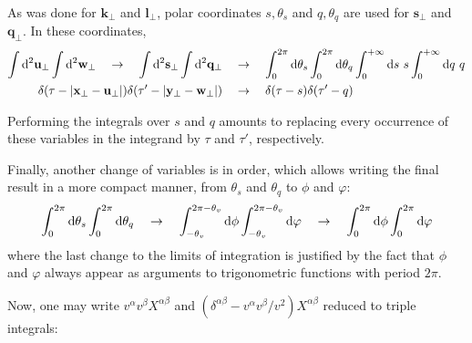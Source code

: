 As was done for $\mathbf{k}_\perp$ and $\mathbf{l}_\perp$, polar coordinates $s, \theta_s$ and $q, \theta_q$ are used for $\mathbf{s}_\perp$ and $\mathbf{q}_\perp$. In these coordinates,
\begin{subequations}
\begin{align}
\int \diff^2 \mathbf{u}_\perp
\int \diff^2 \mathbf{w}_\perp \quad \to \quad 
\int \diff^2 \mathbf{s}_\perp
\int \diff^2 \mathbf{q}_\perp \quad & \to \quad
\int_{0}^{2\pi} \diff \theta_s \int_{0}^{2\pi} \diff \theta_q
\int_0^{+\infty} \diff s ~ s
\int_0^{+\infty} \diff q ~ q \\
\delta(\tau - |\mathbf{x}_\perp - \mathbf{u}_\perp|) \delta(\tau' - |\mathbf{y}_\perp - \mathbf{w}_\perp|) 
\quad & \to \quad
\delta(\tau - s) \delta(\tau' - q)
\end{align}
\end{subequations}

Performing the integrals over $s$ and $q$ amounts to replacing every occurrence of these variables in the integrand by $\tau$ and $\tau'$, respectively. 

Finally, another change of variables is in order, which allows writing the final result in a more compact manner, from $\theta_s$ and $\theta_q$ to $\phi$ and $\varphi$:
\begin{equation}
	\int_{0}^{2\pi} \mathop{}\!\mathrm{d} \theta_s \int_{0}^{2\pi} \mathop{}\!\mathrm{d} \theta_q \quad \to \quad 
	\int_{-\theta_v}^{2\pi-\theta_v} \mathop{}\!\mathrm{d} \phi \int_{-\theta_v}^{2\pi-\theta_v} \mathop{}\!\mathrm{d} \varphi \quad \to \quad
	\int_{0}^{2\pi} \mathop{}\!\mathrm{d} \phi \int_{0}^{2\pi} \mathop{}\!\mathrm{d} \varphi
\end{equation}
where the last change to the limits of integration is justified by the fact that $\phi$ and $\varphi$ always appear as arguments to trigonometric functions with period $2\pi$. 

Now, one may write $v^\alpha v^\beta X^{\alpha \beta}$ and $(\delta^{\alpha \beta} - v^\alpha v^\beta/v^2) X^{\alpha \beta}$ reduced to triple integrals:

